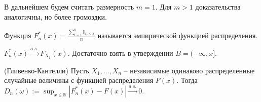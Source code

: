 В дальнейшем будем считать размерность $\displaystyle m=1$. Для $\displaystyle m >1$ доказательства аналогичны, но более громоздки.
\begin{definition}
	Функция $\displaystyle F_{n}^{*}( x) =\frac{\sum _{i=1}^{n}\mathbb{I}_{x_{i} \leqslant x}}{n}$ называется эмпирической функцией распределения.
\end{definition}
\begin{corollary}
	$\displaystyle F_{n}^{*}( x)\xrightarrow{a.s.} F_{X_{1}}( x)$. Достаточно взять в утверждении $\displaystyle B=( -\infty ,x]$.
\end{corollary}
\begin{theorem}
	(Гливенко-Кантелли) Пусть $\displaystyle X_{1} ,\dotsc ,X_{n}$ -- независимые одинаково распределенные случайные величины с функцией распределения $\displaystyle F( x)$. Тогда $\displaystyle D_{n}( \omega ) :=\sup _{x\in \mathbb{R}}\left| F_{n}^{*}( x) -F( x)\right| \xrightarrow{a.s.} 0$.
\end{theorem}
